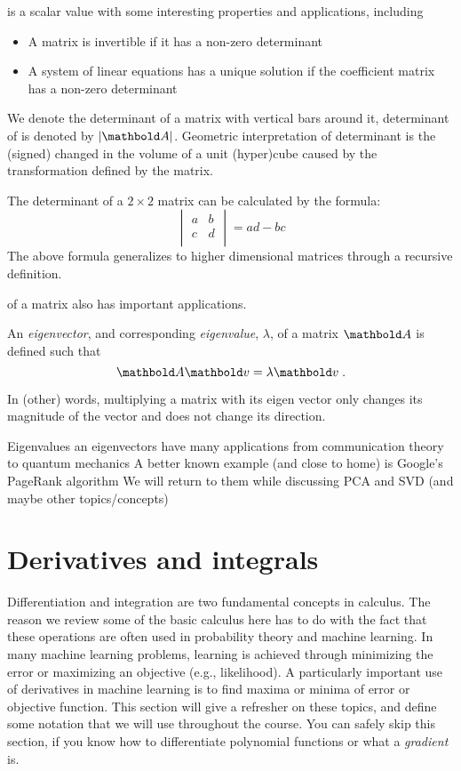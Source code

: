  is a scalar value
with some interesting properties and applications, including
\begin{itemize}
  \item A matrix is invertible if it has a non-zero determinant
  \item A system of linear equations has a unique solution if the coefficient matrix has a non-zero determinant
\end{itemize}

We denote the determinant of a matrix with vertical bars around it,
determinant of  is denoted by $\lvert\vect{A}\rvert$.
Geometric interpretation of determinant is the (signed) changed in the volume of a unit (hyper)cube caused by the transformation defined by the matrix.

The determinant of a $2\times{}2$ matrix can be calculated by the formula:
\[
  \begin{vmatrix}
    a & b \\
    c & d \\
  \end{vmatrix} = a d - b c
\]
The above formula generalizes to higher dimensional matrices through a recursive definition.

 of a matrix also has important applications.

An \emph{eigenvector}, 
and corresponding \emph{eigenvalue}, $\lambda$,
of a matrix $\vect{A}$ is defined such that
\[ \vect{A} \vect{v} = \lambda \vect{v}\;. \] 

In (other) words, multiplying a matrix with its eigen vector
only changes its magnitude of the vector
and does not change its direction.

Eigenvalues an eigenvectors have many applications from communication theory to quantum mechanics
A better known example (and close to home) is Google's PageRank algorithm
We will return to them while discussing PCA
and SVD (and maybe other topics/concepts)


\section{\label{sec:calculus-intro}Derivatives and integrals}

Differentiation and integration are two fundamental concepts in calculus.
The reason we review some of the basic calculus here has to do
with the fact that these operations are often used
in probability theory and machine learning.
In many machine learning problems,
learning is achieved through minimizing the error
or maximizing an objective (e.g., likelihood).
A particularly important use of derivatives in machine learning is
to find maxima or minima of error or objective function.
This section will give a refresher on these topics,
and define some notation that we will use throughout the course. 
You can safely skip this section,
if you know how to differentiate polynomial functions
or what a \emph{gradient} is.

